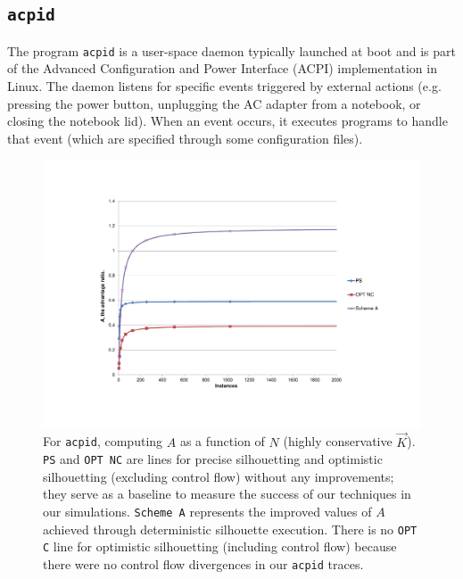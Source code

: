 \subsection{\texttt{acpid}}
The program {\texttt{acpid}} is a user-space daemon
typically launched at boot and is part of the Advanced Configuration
and Power Interface (ACPI) implementation in Linux.
The daemon listens for specific events triggered by 
external actions (e.g. pressing the power button, unplugging the AC adapter from
a notebook, or closing the notebook lid). When an event occurs,
it executes programs to handle that event (which
are specified through some configuration files).

\begin{figure}[h]
  \center
  \includegraphics[scale=0.80, trim=5cm 3cm 0cm 3cm]{acpid-1.pdf}
  \caption[For \texttt{acpid}, $A$ as a function of $N$ (highly conservative $\vec K$)]%
          {
            For \texttt{acpid}, computing $A$ as a function of $N$ (highly conservative $\vec K$).\newline
            \texttt{PS} and \texttt{OPT NC} are lines for precise silhouetting and optimistic 
            silhouetting (excluding control flow) without any improvements; they
            serve as a baseline to measure the success of our techniques
            in our simulations. \texttt{Scheme A} represents the improved values of $A$
            achieved through deterministic silhouette execution. There is no
            \texttt{OPT C} line for optimistic silhouetting (including 
            control flow) because there were no control flow divergences 
            in our \texttt{acpid} traces.
          }
  \label{acpid1}
\end{figure}

